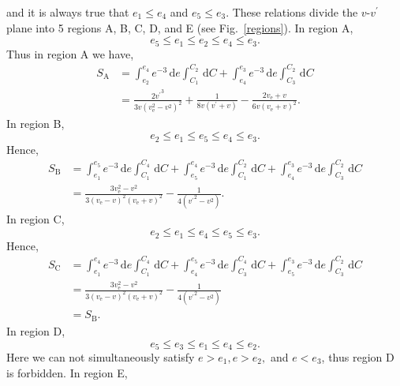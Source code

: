 \documentclass[aps,floatfix,prd,showpacs]{revtex4}
\newcommand{\diff}{\mathrm{d}}
\newcommand{\vesc}{v_{\text{e}}}
\newcommand{\vp}{v^\prime}
\newcommand{\SA}{S_{\text{A}}}
\newcommand{\SB}{S_{\text{B}}}
\newcommand{\SC}{S_{\text{C}}}
\begin{document}
%
%
and it is always true that $e_1 \le e_4$ and $e_5 \le e_3$.  These relations divide the $v$-$ \vp$ plane into 5 regions A, B, C, D, and E (see Fig.~\ref{regions}).  In region A,
%
\begin{equation}
e_5 \le e_1 \le e_2 \le e_4 \le e_3. 
\end{equation} 
%
%
Thus in region A we have,
%
\begin{equation}
\begin{split}
\SA & = \int^{e_4}_{e_2}{e^{-3}}\,\diff e\int^{C_2}_{C_1}\,\diff C + \int^{e_3}_{e_4}{e^{-3}}\,\diff e\int^{C_2}_{C_3}\,\diff C \\
& = \frac{2{\vp}^3}{3v(\vesc^2 - v^2)^2} + \frac{1}{8v(\vp + v)} - \frac{2\vesc + v}{6v(\vesc + v)^2}.
\end{split}
\end{equation}
%
%
In region B,
%
\begin{equation}
e_2 \le e_1 \le e_5 \le e_4 \le e_3.
\end{equation}
%
%
Hence,
%
\begin{equation}
\begin{split}
\SB & = \int^{e_5}_{e_1}{e^{-3}}\,\diff e\int^{C_4}_{C_1}\,\diff C + \int^{e_4}_{e_5}{e^{-3}}\,\diff e\int^{C_2}_{C_1}\,\diff C + \int^{e_3}_{e_4}{e^{-3}}\,\diff e\int^{C_2}_{C_3}\,\diff C \\
& = \frac{3\vesc^2 - v^2}{3(\vesc - v)^2(\vesc+v)^2} - \frac{1}{4({\vp}^2 - v^2)}.
\end{split}
\end{equation}
%
%
In region C,
%
\begin{equation}
e_2 \le e_1 \le e_4 \le e_5 \le e_3.
\end{equation}
%
%
Hence,
%
\begin{equation}
\begin{split}
\SC & = \int^{e_4}_{e_1}{e^{-3}}\,\diff e\int^{C_4}_{C_1}\,\diff C + \int^{e_5}_{e_4}{e^{-3}}\,\diff e\int^{C_4}_{C_3}\,\diff C + \int^{e_3}_{e_5}{e^{-3}}\,\diff e\int^{C_2}_{C_3}\,\diff C \\
& = \frac{3\vesc^2 - v^2}{3(\vesc - v)^2(\vesc+v)^2} - \frac{1}{4({\vp}^2 - v^2)}\\
&= \SB.
\end{split}
\end{equation}
%
%
In region D,
%
\begin{equation}
e_5 \le e_3 \le e_1 \le e_4 \le e_2.
\end{equation}
%
%
Here we can not simultaneously satisfy $e > e_1, e > e_2,$ and $e < e_3$, thus region D is forbidden.  In region E,
\end{document}
